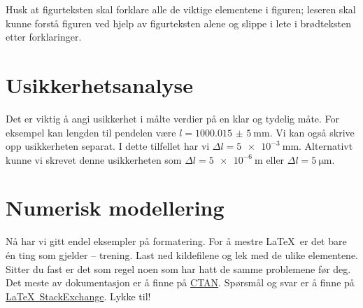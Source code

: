 Husk at figurteksten skal forklare alle de viktige elementene i figuren; leseren skal kunne forstå figuren ved hjelp av figurteksten alene og slippe i lete i brødteksten etter forklaringer. 


\section{Usikkerhetsanalyse}
Det er viktig å angi usikkerhet i målte verdier på en klar og tydelig måte. For eksempel kan lengden til pendelen være $l=\SI{1000,015(5)}{\milli\metre}$. 
Vi kan også skrive opp usikkerheten separat. I dette tilfellet har vi $\Delta l=\SI{5e-3}{\milli\metre}$. Alternativt kunne vi skrevet denne usikkerheten som $\Delta l=\SI{5e-6}{\metre}$ eller $\Delta l=\SI{5}{\micro\metre}$.


\section{Numerisk modellering}
Nå har vi gitt endel eksempler på formatering. For å mestre \LaTeX\ er det bare én ting som gjelder -- trening. Last ned kildefilene og lek med de ulike elementene. Sitter du fast er det som regel noen som har hatt de samme problemene før deg. Det meste av dokumentasjon er å finne på \href{http://www.ctan.org/}{CTAN}. Spørsmål og svar er å finne på \href{http://tex.stackexchange.com/}{\LaTeX\ StackExchange}. Lykke til!

